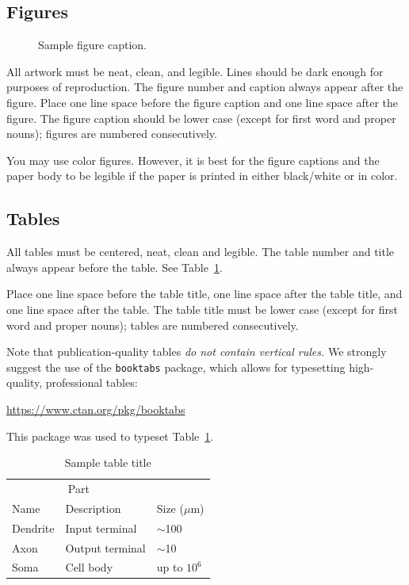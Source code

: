 \documentclass{article}
\begin{document}
\subsection{Figures}

\begin{figure}
  \centering
  \fbox{\rule[-.5cm]{0cm}{4cm} \rule[-.5cm]{4cm}{0cm}}
  \caption{Sample figure caption.}
\end{figure}

All artwork must be neat, clean, and legible. Lines should be dark enough for
purposes of reproduction. The figure number and caption always appear after the
figure. Place one line space before the figure caption and one line space after
the figure. The figure caption should be lower case (except for first word and
proper nouns); figures are numbered consecutively.

You may use color figures.  However, it is best for the figure captions and the
paper body to be legible if the paper is printed in either black/white or in
color.

\subsection{Tables}

All tables must be centered, neat, clean and legible.  The table number and
title always appear before the table.  See Table~\ref{sample-table}.

Place one line space before the table title, one line space after the
table title, and one line space after the table. The table title must
be lower case (except for first word and proper nouns); tables are
numbered consecutively.

Note that publication-quality tables \emph{do not contain vertical rules.} We
strongly suggest the use of the \verb+booktabs+ package, which allows for
typesetting high-quality, professional tables:
\begin{center}
  \url{https://www.ctan.org/pkg/booktabs}
\end{center}
This package was used to typeset Table~\ref{sample-table}.

\begin{table}
  \caption{Sample table title}
  \label{sample-table}
  \centering
  \begin{tabular}{lll}
    \toprule
    \multicolumn{2}{c}{Part}                   \\
    \cmidrule(r){1-2}
    Name     & Description     & Size ($\mu$m) \\
    \midrule
    Dendrite & Input terminal  & $\sim$100     \\
    Axon     & Output terminal & $\sim$10      \\
    Soma     & Cell body       & up to $10^6$  \\
    \bottomrule
  \end{tabular}
\end{table}
\end{document}
